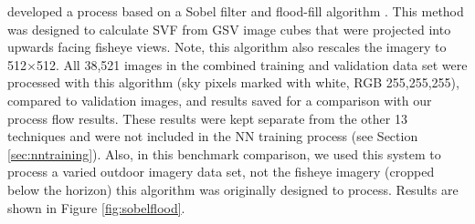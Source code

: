 \documentclass[final,3p,times,authoryear]{elsarticle}
\begin{document}
\cite{Middel2018} developed a process based on a Sobel filter \citep{Sobel1968} and flood-fill algorithm \citep{Laungrungthip2008,Middel2017}. This method was designed to calculate SVF from GSV image cubes that were projected into upwards facing fisheye views. Note, this algorithm also rescales the imagery to 512$\times$512. All 38,521 images in the combined training and validation data set were processed with this algorithm (sky pixels marked with white, RGB 255,255,255), compared to validation images, and results saved for a comparison with our process flow results. These results were kept separate from the other 13 techniques and were not included in the NN training process (see Section \ref{sec:nntraining}). Also, in this benchmark comparison, we used this system to process a varied outdoor imagery data set, not the fisheye imagery (cropped below the horizon) this algorithm was originally designed to process. Results are shown in Figure \ref{fig:sobelflood}.
\end{document}

